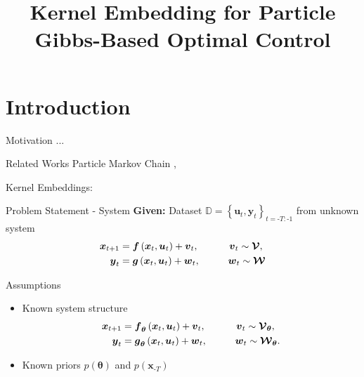 \documentclass[student, noshadow, itr, english, aspectratio=169]{ITR_LSR_slides}
\title{Kernel Embedding for Particle Gibbs-Based Optimal Control}
\begin{document}
\begin{frame}
    \titlepage
\end{frame}


\section{Introduction}
\begin{frame}{Motivation}	
...
\end{frame}


\begin{frame}{Related Works}
Particle Markov Chain	
\cite{Robert_24}, \cite{Andrieu_10}

Kernel Embeddings:
\cite{Yassine_22}

\end{frame}

\begin{frame}{Problem Statement - System}	
	\textbf{Given:} Dataset $\mathbb{D} = \left\{\boldsymbol{u}_{t}, \boldsymbol{y}_{t}\right\}_{t = \text{-}T:\text{-}1}$ from unknown system
	\begin{equation*}
	\begin{split}
	\boldsymbol{x}_{t+1} &= \boldsymbol{f} \left( \boldsymbol{x}_{t}, \boldsymbol{u}_t \right) + \boldsymbol{v}_{t}, \makebox[1cm]{\hfill} \; \boldsymbol{v}_{t} \sim \boldsymbol{\mathcal{V}},\\
	\boldsymbol{y}_{t} &= \boldsymbol{g} \left( \boldsymbol{x}_{t}, \boldsymbol{u}_t \right) + \boldsymbol{w}_{t}, \makebox[1cm]{\hfill} \boldsymbol{w}_{t} \sim \boldsymbol{\mathcal{W}}
	\end{split}
	\end{equation*}

	\begin{block}{Assumptions}
	\begin{itemize}
		\item 
		Known system structure
	\begin{equation*}
	\begin{split}
	\boldsymbol{x}_{t+1} &= \boldsymbol{f}_{\boldsymbol{\theta}} \left( \boldsymbol{x}_{t}, \boldsymbol{u}_t \right) + \boldsymbol{v}_{t}, \makebox[1cm]{\hfill} \; \boldsymbol{v}_{t} \sim \boldsymbol{\mathcal{V}}_{\boldsymbol{\theta}},\\
	\boldsymbol{y}_{t} &= \boldsymbol{g}_{\boldsymbol{\theta}} \left( \boldsymbol{x}_{t}, \boldsymbol{u}_t \right) + \boldsymbol{w}_{t}, \makebox[1cm]{\hfill} \boldsymbol{w}_{t} \sim \boldsymbol{\mathcal{W}}_{\boldsymbol{\theta}}.
	\end{split}
	\end{equation*}
	\item 
	Known priors $p(\boldsymbol{\theta})$ and $p(\boldsymbol{x}_{\text{-}T})$
	\end{itemize}
	\end{block}	


\end{frame}
\end{document}
